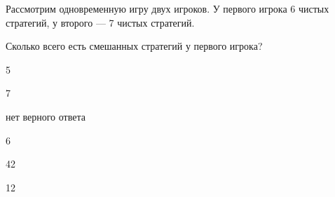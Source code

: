 
\begin{question}
Рассмотрим одновременную игру двух игроков. У первого игрока 6 чистых
стратегий, у второго --- 7 чистых стратегий.

Сколько всего есть смешанных стратегий у первого игрока?
\begin{answerlist}
  \item 5
  \item 7
  \item нет верного ответа
  \item 6
  \item 42
  \item 12
\end{answerlist}
\end{question}


